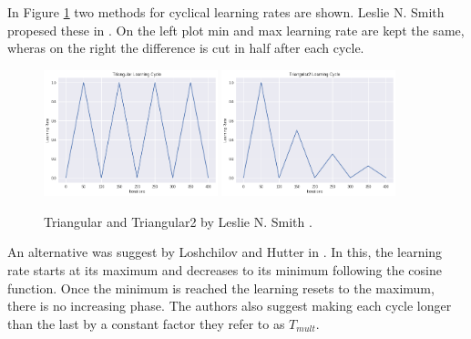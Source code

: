 In Figure \ref{fig:triangular_cyclical_learning_rate} two methods for cyclical learning rates are shown.
Leslie N. Smith propesed these in \cite{Smith_2015}.
On the left plot min and max learning rate are kept the same, wheras on the right the difference is cut in half after each cycle.


\begin{figure}
    \centering
    \includegraphics[width=0.45\textwidth]{./img/triangular.png}
    \includegraphics[width=0.45\textwidth]{./img/triangular2.png}
    \caption{Triangular and Triangular2 by Leslie N. Smith \cite{Smith_2015}.}
    \label{fig:triangular_cyclical_learning_rate}
\end{figure}

An alternative was suggest by Loshchilov and Hutter in \cite{Loshchilov_Hutter_2016}.
In this, the learning rate starts at its maximum and decreases to its minimum following the cosine function.
Once the minimum is reached the learning resets to the maximum, there is no increasing phase.
The authors also suggest making each cycle longer than the last by a constant factor they refer to as $T_{mult}$.

